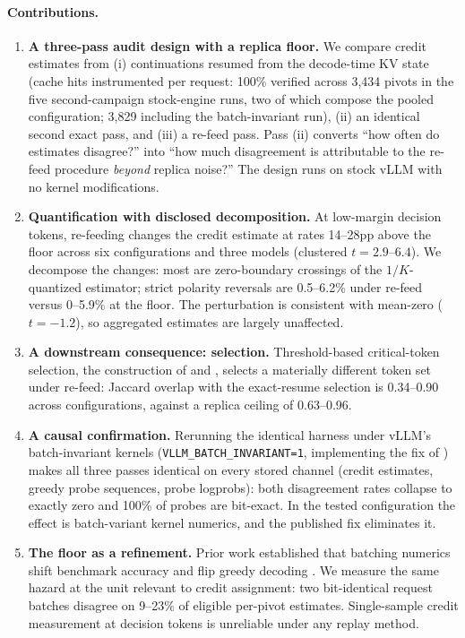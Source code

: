 \documentclass[11pt]{article}
\begin{document}
\paragraph{Contributions.}
\begin{enumerate}
  \item \textbf{A three-pass audit design with a replica floor.} We compare
  credit estimates from (i) continuations resumed from the decode-time KV
  state (cache hits instrumented per request: 100\% verified across 3{,}434
  pivots in the five second-campaign stock-engine runs, two of which compose
  the pooled configuration; 3{,}829 including the
  batch-invariant run), (ii) an identical second exact pass, and (iii) a re-feed pass.
  Pass (ii) converts ``how often do estimates disagree?'' into ``how much
  disagreement is attributable to the re-feed procedure \emph{beyond}
  replica noise?'' The design runs on stock vLLM \citep{kwon2023vllm} with
  no kernel modifications.
  \item \textbf{Quantification with disclosed decomposition.} At low-margin
  decision tokens, re-feeding changes the credit estimate at rates 14--28pp
  above the
  floor across six configurations and three models (clustered
  $t=2.9$--$6.4$). We decompose the changes: most are zero-boundary
  crossings of the $1/K$-quantized estimator; strict polarity reversals are
  0.5--6.2\% under re-feed versus 0--5.9\% at the floor. The perturbation is
  consistent with mean-zero ($t = -1.2$), so aggregated estimates are
  largely unaffected.
  \item \textbf{A downstream consequence: selection.}
  Threshold-based critical-token selection, the construction of
  \citet{lin2024critical} and \citet{ruan2025cft}, selects a materially
  different token set under re-feed: Jaccard overlap with the exact-resume
  selection is 0.34--0.90 across configurations, against a replica ceiling
  of 0.63--0.96.
  \item \textbf{A causal confirmation.} Rerunning the identical harness
  under vLLM's batch-invariant kernels (\texttt{VLLM\_BATCH\_INVARIANT=1},
  implementing the fix of \citet{he2025nondeterminism}) makes all three passes
  identical on every stored channel (credit estimates, greedy probe
  sequences, probe logprobs): both disagreement rates collapse to exactly
  zero and 100\% of probes are bit-exact. In the tested configuration the
  effect is batch-variant kernel numerics, and the published fix
  eliminates it.
  \item \textbf{The floor as a refinement.} Prior work established that
  batching numerics shift benchmark accuracy and flip greedy decoding
  \citep{yuan2025numerical, song2024greedy}. We measure the same hazard at
  the unit relevant to credit assignment: two bit-identical request batches
  disagree on 9--23\% of eligible per-pivot estimates. Single-sample credit
  measurement at decision tokens is unreliable under any replay method.
\end{enumerate}
\end{document}
